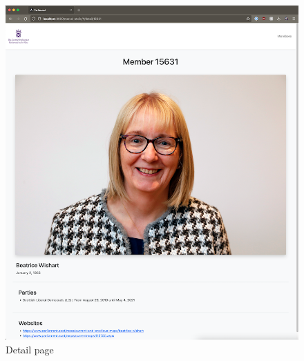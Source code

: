 \begin{figure}[h]
\centering
\includegraphics[scale=1]{images/03_depl/member-detail}
\caption{Detail page}
\label{fig:subsubsec:03_depl_detail}
\end{figure}
\newpage
